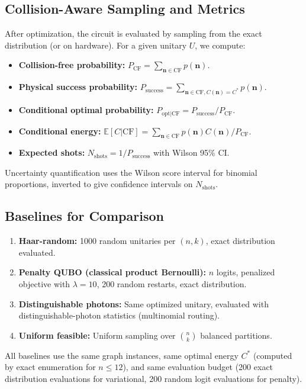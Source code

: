 \subsection{Collision-Aware Sampling and Metrics}

After optimization, the circuit is evaluated by sampling from the exact distribution (or on hardware). For a given unitary $U$, we compute:

\begin{itemize}
\item \textbf{Collision-free probability:} $P_{\mathrm{CF}} = \sum_{\mathbf{n}\in\mathrm{CF}} p(\mathbf{n})$.
\item \textbf{Physical success probability:} $P_{\mathrm{success}} = \sum_{\mathbf{n}\in\mathrm{CF}, C(\mathbf{n})=C^*} p(\mathbf{n})$.
\item \textbf{Conditional optimal probability:} $P_{\mathrm{opt|CF}} = P_{\mathrm{success}} / P_{\mathrm{CF}}$.
\item \textbf{Conditional energy:} $\mathbb{E}[C|\mathrm{CF}] = \sum_{\mathbf{n}\in\mathrm{CF}} p(\mathbf{n}) C(\mathbf{n}) / P_{\mathrm{CF}}$.
\item \textbf{Expected shots:} $N_{\mathrm{shots}} = 1 / P_{\mathrm{success}}$ with Wilson 95\% CI.
\end{itemize}

Uncertainty quantification uses the Wilson score interval for binomial proportions, inverted to give confidence intervals on $N_{\mathrm{shots}}$.

\subsection{Baselines for Comparison}

\begin{enumerate}
\item \textbf{Haar-random:} 1000 random unitaries per $(n,k)$, exact distribution evaluated.
\item \textbf{Penalty QUBO (classical product Bernoulli):} $n$ logits, penalized objective with $\lambda=10$, 200 random restarts, exact distribution.
\item \textbf{Distinguishable photons:} Same optimized unitary, evaluated with distinguishable-photon statistics (multinomial routing).
\item \textbf{Uniform feasible:} Uniform sampling over $\binom{n}{k}$ balanced partitions.
\end{enumerate}

All baselines use the same graph instances, same optimal energy $C^*$ (computed by exact enumeration for $n\le 12$), and same evaluation budget (200 exact distribution evaluations for variational, 200 random logit evaluations for penalty).
